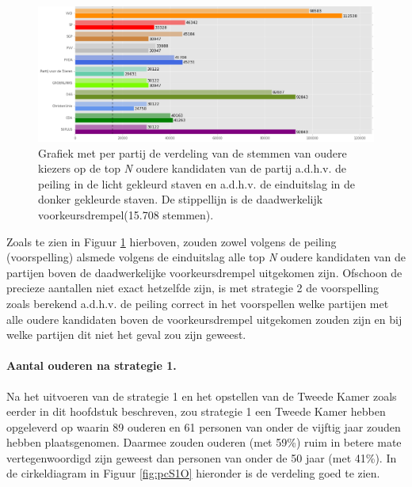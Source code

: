 \begin{figure}[H]

	\includegraphics[width=\linewidth]	{stemmen_op_ouderen_topN_peiling.png}

			\caption{Grafiek met per partij de verdeling van de stemmen van oudere kiezers op de top \textit{N} oudere kandidaten van de partij a.d.h.v. de peiling \citep{IPSOS} in de licht gekleurd staven en a.d.h.v. de einduitslag \citep{Kiesraad_databank} in de donker gekleurde staven. De stippellijn is de daadwerkelijk voorkeursdrempel(15.708 stemmen).}

\label{fig:stemmenS1O}
\end{figure}


Zoals te zien in Figuur \ref{fig:stemmenS1O} hierboven, zouden zowel volgens de peiling (voorspelling) alsmede volgens de einduitslag alle top \textit{N} oudere kandidaten van de partijen boven de daadwerkelijke voorkeursdrempel uitgekomen zijn. Ofschoon de precieze aantallen niet exact hetzelfde zijn, is met strategie 2 de voorspelling zoals berekend a.d.h.v. de peiling correct in het voorspellen welke partijen met alle oudere kandidaten boven de voorkeursdrempel uitgekomen zouden zijn en bij welke partijen dit niet het geval zou zijn geweest.

\paragraph{Aantal ouderen na strategie 1.}
Na het uitvoeren van de strategie 1 en het opstellen van de Tweede Kamer zoals eerder in dit hoofdstuk beschreven, zou strategie 1 een Tweede Kamer hebben opgeleverd op waarin  89 ouderen en 61 personen van onder de vijftig jaar zouden hebben plaatsgenomen. Daarmee zouden ouderen (met 59\%) ruim in betere mate vertegenwoordigd zijn geweest dan personen van onder de 50 jaar (met 41\%). In de cirkeldiagram in Figuur \ref{fig:pcS1O} hieronder is de verdeling goed te zien. 

